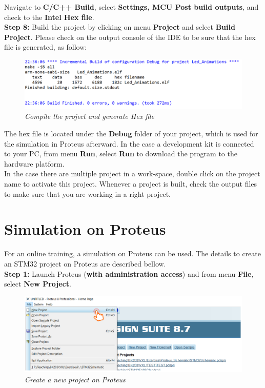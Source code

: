 Navigate to \textbf{C/C++ Build}, select \textbf{Settings, MCU Post build outputs}, and check to the \textbf{Intel Hex file}. \\

\textbf{Step 8: } Build the project by clicking on menu \textbf{Project} and select \textbf{Build Project}. Please check on the output console of the IDE to be sure that the hex file is generated, as follow:

\begin{figure}[!htp]
    \centering
    \includegraphics[width=5in]{source/picture/bai_1/stm_08.PNG}
    \caption{\textit{Compile the project and generate Hex file}}
    \label{bai1_pic8}
\end{figure}

The hex file is located under the \textbf{Debug} folder of your project, which is used for the simulation in Proteus afterward. In the case a development kit is connected to your PC, from menu \textbf{Run}, select \textbf{Run} to download the program to the hardware platform. \\

In the case there are multiple project in a work-space, double click on the project name to activate this project. Whenever a project is built, check the output files to make sure that you are working in a right project.


\newpage
\section{Simulation on Proteus}
For an online training, a simulation on Proteus can be used. The details to create an STM32 project on Proteus are described bellow.\\

\textbf{Step 1: } Launch Proteus (\textbf{with administration access}) and from menu \textbf{File}, select \textbf{New Project}.\\

\begin{figure}[!htp]
    \centering
    \includegraphics[width=5in]{source/picture/bai_1/pic5.PNG}
    \caption{\textit{Create a new project on Proteus}}
    \label{bai1_pic5}
\end{figure}


